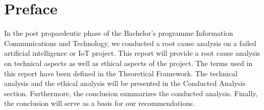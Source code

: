 \chapter*{Preface}

In the post propaedeutic phase of the Bachelor’s programme Information Communications and Technology, we conducted a root cause analysis
on a failed artificial intelligence or IoT project. This report will provide a root cause analysis on technical aspects as well as ethical
aspects of the project. The terms used in this report have been defined in the Theoretical Framework. The technical analysis and the ethical analysis will be presented in the Conducted Analysis section. Furthermore, the conclusion summarizes the conducted analysis. Finally, the conclusion will serve as a basis for our recommendations.
